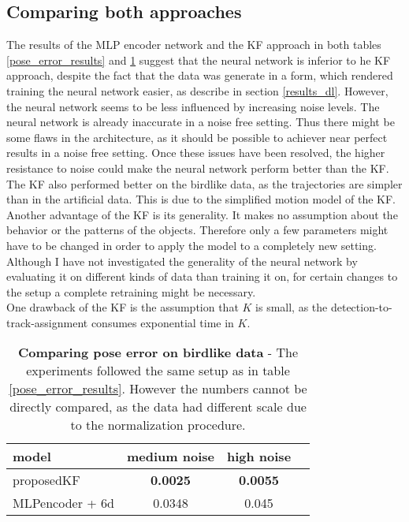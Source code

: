 \documentclass[12pt,a4paper]{article}
\begin{document}
\subsection{Comparing both approaches}
\label{comparison}
The results of the MLP encoder network and the KF approach in both tables \ref{pose_error_results} and \ref{table_KF_vs_NN} suggest that the neural network is inferior to he KF approach, despite the fact that the data was generate in a form, which rendered training the neural network  easier, as describe in section \ref{results_dl}. However, the neural network seems to be less influenced by increasing noise levels. The neural network is already inaccurate in a noise free setting. Thus there might be some flaws in the architecture, as it should be possible to achiever near perfect results in a noise free setting. Once these issues have been resolved, the higher resistance to noise could make the neural network perform better than the KF. \\
The KF also performed better on the birdlike data, as the trajectories are simpler than in the artificial data. This is due to the simplified motion model of the KF. \\
Another advantage of the KF is its generality. It makes no assumption about the behavior or the patterns of the objects. Therefore only a few parameters might have to be changed in order to apply the model to a completely new setting. Although I have not investigated the generality of the neural network by evaluating it on different kinds of data than training it on, for certain changes to the setup a complete retraining might be necessary. \\
One drawback of the KF is the assumption that $K$ is small, as the detection-to-track-assignment consumes exponential time in $K$.

\begin{table}[h!]
	\centering
	\begin{tabular}{|l |c| c| c|} 
		\hline
		model &  medium noise & high noise \\ \hline
		\hline
		proposedKF &  \textbf{0.0025} & \textbf{0.0055} \\ \hline
		MLPencoder + 6d &  0.0348 & 0.045 \\ 
		\hline
	\end{tabular}\\
	\bigskip
	\caption{\textbf{Comparing pose error on birdlike data} -  The experiments followed the same setup as in table \ref{pose_error_results}. However the numbers cannot be directly compared, as the data had different scale due to the normalization procedure.}
	\label{table_KF_vs_NN}
\end{table}
\end{document}
